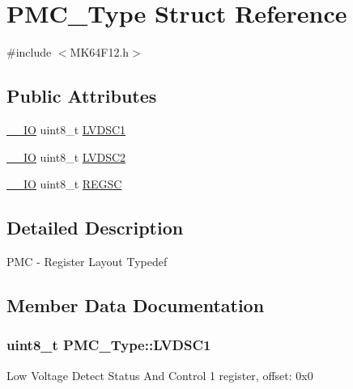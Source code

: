 \hypertarget{structPMC__Type}{}\section{P\+M\+C\+\_\+\+Type Struct Reference}
\label{structPMC__Type}


{\ttfamily \#include $<$M\+K64\+F12.\+h$>$}

\subsection*{Public Attributes}
\begin{DoxyCompactItemize}
\item 
\hyperlink{core__sc300_8h_aec43007d9998a0a0e01faede4133d6be}{\+\_\+\+\_\+\+IO} uint8\+\_\+t \hyperlink{structPMC__Type_a2aa5e7cebe52d9d7fbe071a4751b2a6c}{L\+V\+D\+S\+C1}
\item 
\hyperlink{core__sc300_8h_aec43007d9998a0a0e01faede4133d6be}{\+\_\+\+\_\+\+IO} uint8\+\_\+t \hyperlink{structPMC__Type_abc2abe9e83245fcd84da5a78bbea23ea}{L\+V\+D\+S\+C2}
\item 
\hyperlink{core__sc300_8h_aec43007d9998a0a0e01faede4133d6be}{\+\_\+\+\_\+\+IO} uint8\+\_\+t \hyperlink{structPMC__Type_a23fa3c271bf9f25b06221b037553f936}{R\+E\+G\+SC}
\end{DoxyCompactItemize}


\subsection{Detailed Description}
P\+MC -\/ Register Layout Typedef 

\subsection{Member Data Documentation}
\subsubsection[{\texorpdfstring{L\+V\+D\+S\+C1}{LVDSC1}}]{ uint8\+\_\+t P\+M\+C\+\_\+\+Type\+::\+L\+V\+D\+S\+C1}\hypertarget{structPMC__Type_a2aa5e7cebe52d9d7fbe071a4751b2a6c}{}\label{structPMC__Type_a2aa5e7cebe52d9d7fbe071a4751b2a6c}
Low Voltage Detect Status And Control 1 register, offset\+: 0x0 
